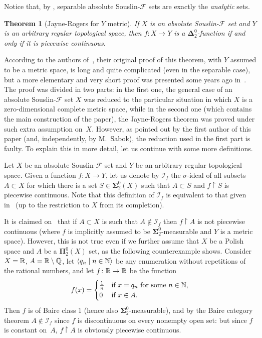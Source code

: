 \documentclass{raex}
\newcommand{\R}{\RealNumbers}
\newcommand{\Q}{\RationalNumbers}
\newcommand{\N}{\NaturalNumbers}
\theoremstyle{plain}
\newtheorem{thm}{Theorem}
\theoremstyle{definition}
\theoremstyle{remark}
\def\D{\mathbf{\Delta}}
\def\S{\mathbf{\Sigma}}
\def\P{\mathbf{\Pi}}
\def\F{\mathcal{F}}
\def\I{\mathcal{I}}
\begin{document}
Notice that, by \cite[Theorem~25.7]{kechris}, separable absolute Souslin-$\F$ sets are exactly the \emph{analytic} sets.


\begin{thm}[Jayne-Rogers for $Y$ metric]\label{theorJR}
If $X$ is an absolute Souslin-$\F$ set and $Y$ is an arbitrary regular topological space, then $ f\colon X \to Y$ is a $\D^0_2$-function if and only if it is piecewise continuous.
\end{thm}

According to the authors of~\cite{jaynerogers}, their original proof of this theorem, with $Y$ assumed to be a metric space, is long and quite complicated (even in the separable case), but a more elementary and very short proof was presented some years ago in~\cite{mot-sem}. The proof was divided in two parts: in the first one, the general case of an absolute Souslin-$\F$ set $X$ was reduced to the particular situation in which $X$ is a zero-dimensional complete metric space, while in the second one (which contains the main construction of the paper), the Jayne-Rogers theorem was proved under such extra assumption on~$X$. 
However, as pointed out by the first author of this paper (and, independently, by M.~Sabok), the reduction used in the first part is faulty. To explain this in more detail, let us continue with some more definitions. 

Let $X$ be an absolute Souslin-$\F$ set and $Y$ be an arbitrary regular topological space. 
Given a function $f \colon X \to Y$, let us denote by $\I_f$ the $\sigma$-ideal of all subsets $A \subset X$ for which there is a set $S\in\S^0_2(X)$ such that $A \subset S$ and $f \restriction S$ is piecewise continuous. Note that this definition of $\I_f$ is equivalent to that given in~\cite{mot-sem} (up to the restriction to $X$ from its completion).

It is claimed on~\cite[p.~197]{mot-sem} that if $A \subset X$ is such that $A \notin \I_f$ then $f\restriction A$ is not piecewise continuous (where $f$ is implicitly assumed to be $\S^0_2$-measurable and $Y$ is a metric space). However, this is not true even if we further assume that $X$ be a Polish space and $A$ be a $\P^0_2(X)$ set, as the following counterexample shows. Consider $X = \R$, $A=\R \setminus \Q$, let $\langle q_n \mid n \in \N \rangle$ be any enumeration without repetitions of the rational numbers, and let $f \colon \R \to \R$ be the function
\[
f(x)=
\begin{cases}
\frac{1}{n}& \text{if } x=q_n \text{ for some }n \in \N,\\
0 & \text{if } x \in A.
\end{cases}
\]
Then $f$ is of Baire class $1$ (hence also $\S^0_2$-measurable), and by the Baire category theorem $A \notin \I_f$ since $f$ is discontinuous on every nonempty open set: but since $f$ is constant on~$A$, $f \restriction A$ is obviously piecewise continuous.
\end{document}
